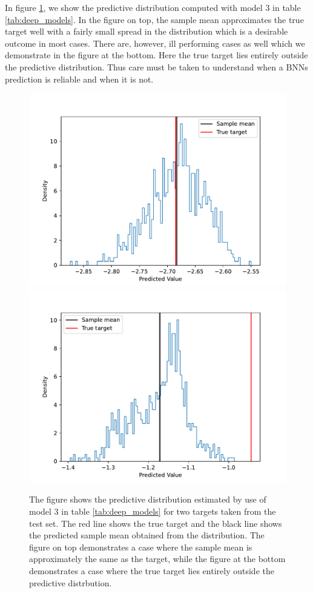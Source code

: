 In figure \ref{fig:predictive_distributions}, we show the predictive distribution computed with model 3 in table \ref{tab:deep_models}. In the figure on top, the sample mean approximates the true target well with a fairly small spread in the distribution which is a desirable outcome in most cases. There are, however, ill performing cases as well which we demonstrate in the figure at the bottom. Here the true target lies entirely outside the predictive distribution. Thus care must be taken to understand when a BNNs prediction is reliable and when it is not. 
\begin{figure}[H]
    \centering
    \includegraphics[scale=0.5]{figures/predictive_distributions/predictive_distribution_point_idx_360.pdf}
    \includegraphics[scale=0.5]{figures/predictive_distributions/predictive_distribution_point_idx_2052.pdf}
    \caption{
        The figure shows the predictive distribution estimated by use of model 3 in table \ref{tab:deep_models} for two targets taken from the test set. The red line shows the true target and the black line shows the predicted sample mean obtained from the distribution. The figure on top demonstrates a case where the sample mean is approximately the same as the target, while the figure at the bottom demonstrates a case where the true target lies entirely outside the predictive distrbution. 
    }
    \label{fig:predictive_distributions}
\end{figure}


